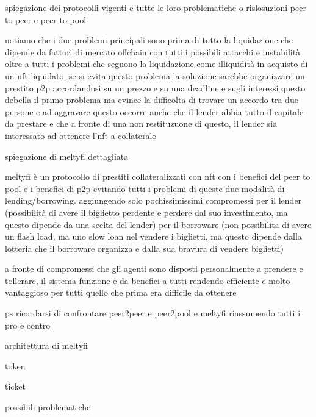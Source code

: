 \documentclass[main.tex]{subfiles}
\begin{document}
spiegazione dei protocolli vigenti e tutte le loro problematiche o rislosuzioni
peer to peer e peer to pool

notiamo che i due problemi principali sono prima di tutto la liquidazione che dipende da fattori di mercato offchain con tutti i possibili attacchi e instabilità oltre a tutti i problemi che seguono la liquidazione come illiquidità in acquisto di un nft liquidato,
se si evita questo problema la soluzione sarebbe organizzare un prestito p2p accordandosi su un prezzo e su una deadline e sugli interessi
questo debella il primo problema ma evince la difficolta di trovare un accordo tra due persone e ad aggravare questo occorre anche che il lender abbia tutto il capitale da prestare e che a fronte di una non restituzuone di questo, il lender sia interessato ad ottenere l'nft a collaterale

spiegazione di meltyfi dettagliata 

meltyfi è un protocollo di prestiti collateralizzati con nft con i benefici del peer to pool e i benefici di p2p evitando tutti i problemi di queste due modalità di lending/borrowing. aggiungendo solo pochissimissimi compromessi per il lender (possibilità di avere il biglietto perdente e perdere dal suo investimento, ma questo dipende da una scelta del lender) per il borroware (non possibilita di avere un flash load, ma uno slow loan nel vendere i biglietti, ma questo dipende dalla lotteria che il borroware organizza e dalla sua bravura di vendere biglietti)

a fronte di compromessi che gli agenti sono disposti personalmente a prendere e tollerare, il sistema funzione e da benefici a tutti rendendo efficiente e molto vantaggioso per tutti quello che prima era difficile da ottenere

ps ricordarsi di confrontare peer2peer e peer2pool e meltyfi riassumendo tutti i pro e contro








architettura di meltyfi

token

ticket

possibili problematiche 
\end{document}
